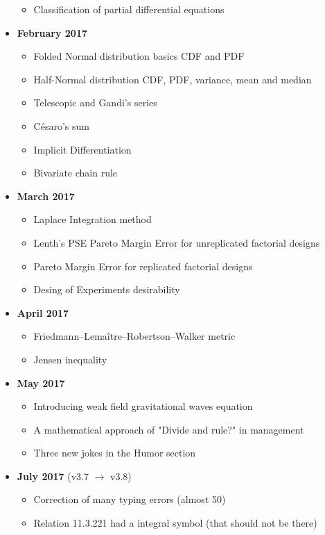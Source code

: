 \documentclass[12pt,a4paper,twoside,openright]{report}
\theoremstyle{definition}
\theoremstyle{itexmp}
\numberwithin{equation}{section}
\begin{document}
\begin{itemize}
\begin{itemize}[noitemsep]
				\item Classification of partial differential equations
			\end{itemize}
		\item \textbf{February 2017}
			\begin{itemize}[noitemsep]
				\item Folded Normal distribution basics CDF and PDF
				\item Half-Normal distribution CDF, PDF, variance, mean and median
				\item Telescopic and Gandi's series
				\item Césaro's sum
				\item Implicit Differentiation
				\item Bivariate chain rule
			\end{itemize}
		\item \textbf{March 2017}
			\begin{itemize}[noitemsep]
				\item Laplace Integration method
				\item Lenth's PSE Pareto Margin Error for unreplicated factorial designs
				\item Pareto Margin Error for replicated factorial designs
				\item Desing of Experiments desirability
			\end{itemize}
		\item \textbf{April 2017}
			\begin{itemize}[noitemsep]
				\item Friedmann–Lemaître–Robertson–Walker metric
				\item Jensen inequality
			\end{itemize}
		\item \textbf{May 2017}
			\begin{itemize}[noitemsep]
				\item Introducing weak field gravitational waves equation
				\item A mathematical approach of "Divide and rule?" in management
				\item Three new jokes in the Humor section
			\end{itemize}
		\item \textbf{July 2017} (v3.7 $\rightarrow$ v3.8)
			\begin{itemize}[noitemsep]
				\item Correction of many typing errors (almost 50)
				\item Relation 11.3.221 had a integral symbol  (that should not be there)

\end{itemize}
\end{itemize}
\end{document}
